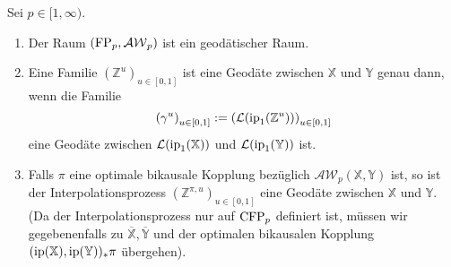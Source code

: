 \begin{theorem}
    Sei $p \in [1, \infty)$.
\begin{enumerate}
    \item[(i)] Der Raum $(\operatorname{FP}_p, \mathcal{AW}_p)$ ist ein geodätischer Raum.
    \item[(ii)] Eine Familie $(\mathbb{Z}^u)_{u \in [0,1]}$ ist eine Geodäte zwischen $\mathbb{X}$ und $\mathbb{Y}$ genau dann, wenn die Familie 
    $$\left( \gamma^u \right)_{u \in [0,1]} := \left( \mathcal{L}(\operatorname{ip}_1(\mathbb{Z}^u)) \right)_{u \in [0,1]}$$
    eine Geodäte zwischen $\mathcal{L}(\operatorname{ip}_1(\mathbb{X}))$ und $\mathcal{L}(\operatorname{ip}_1(\mathbb{Y}))$ ist.
    \item[(iii)] Falls $\pi$ eine optimale bikausale Kopplung bezüglich $\mathcal{AW}_p(\mathbb{X,Y})$ ist, so ist der Interpolationsprozess $\left(\mathbb{Z}^{\pi, u}\right)_{u \in [0,1]}$ eine Geodäte zwischen $\mathbb{X}$ und $\mathbb{Y}$. (Da der Interpolationsprozess nur auf $\operatorname{CFP}_p$ definiert ist, müssen wir gegebenenfalls zu $\overline{\mathbb{X}}, \overline{\mathbb{Y}}$ und der optimalen bikausalen Kopplung $(\operatorname{ip}(\mathbb{X}), \operatorname{ip}(\mathbb{Y}))_* \pi$ übergehen).
\end{enumerate}
\end{theorem}
